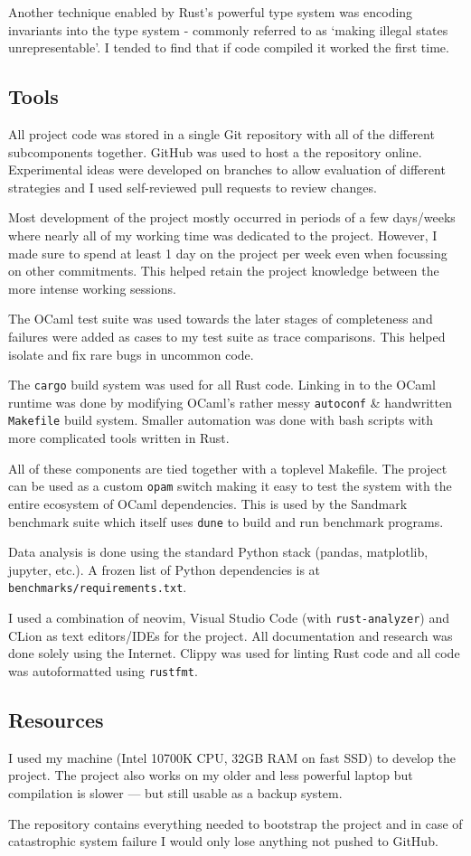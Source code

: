 Another technique enabled by Rust's powerful type system was encoding invariants into the type
system - commonly referred to as `making illegal states unrepresentable'. I tended to find that if
code compiled it worked the first time.

\subsection{Tools}

All project code was stored in a single Git repository with all of the different subcomponents
together. GitHub was used to host a the repository online. Experimental ideas were developed on
branches to allow evaluation of different
strategies and I used self-reviewed pull requests to review changes.

Most development of the project mostly occurred in periods of a few days/weeks where nearly
all of my working time was dedicated to the project. However, I made sure to spend at least 1 day
on the project per week even when focussing on other commitments. This helped retain the project
knowledge between the more intense working sessions.

The OCaml test suite was used towards the later stages of completeness and failures were added as
cases to my test suite as trace comparisons. This helped isolate and fix rare bugs in uncommon
code.

The \texttt{cargo} build system was used for all Rust code. Linking in to the OCaml runtime
was done by modifying OCaml's rather messy \texttt{autoconf} \& handwritten \texttt{Makefile} build
system. Smaller automation was done with bash scripts with more complicated tools written in Rust.

All of these components are tied together with a toplevel Makefile. The project can be used as a
custom
\texttt{opam} switch making it easy to test the system with the entire ecosystem of OCaml
dependencies.
This is used by the Sandmark benchmark suite which itself uses \texttt{dune} to build and run
benchmark programs.

Data analysis is done using the standard Python stack (pandas, matplotlib, jupyter, etc.). A frozen
list of Python dependencies is at \texttt{benchmarks/requirements.txt}.

I used a combination of neovim, Visual Studio Code (with \texttt{rust-analyzer}) and CLion as text
editors/IDEs for the project. All documentation and research was done solely using the Internet.
Clippy was used for linting Rust code and all code was autoformatted using \texttt{rustfmt}.

\subsection{Resources}

I used my machine (Intel 10700K CPU, 32GB RAM on fast SSD) to develop the project. The project also
works on my older and less powerful laptop but compilation is slower --- but still usable as a
backup system.

The repository contains everything needed to bootstrap the project and in case of catastrophic
system failure I would only lose anything not pushed to GitHub.
